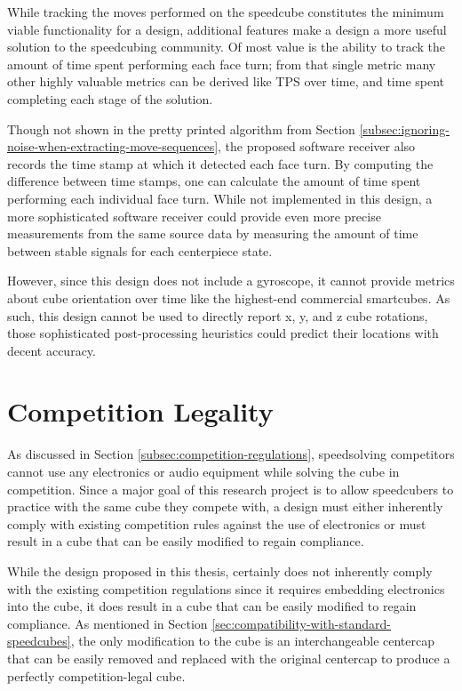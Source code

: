 While tracking the moves performed on the speedcube constitutes the
minimum viable functionality for a design, additional features make a
design a more useful solution to the speedcubing community. Of most
value is the ability to track the amount of time spent performing each
face turn; from that single metric many other highly valuable metrics
can be derived like TPS over time, and time spent completing each stage
of the solution.

Though not shown in the pretty printed algorithm from Section
\ref{subsec:ignoring-noise-when-extracting-move-sequences}, the
proposed software receiver also records the time stamp at which it
detected each face turn. By computing the difference between time
stamps, one can calculate the amount of time spent performing each
individual face turn. While not implemented in this design, a more
sophisticated software receiver could provide even more precise
measurements from the same source data by measuring the amount of time
between stable signals for each centerpiece state.

However, since this design does not include a gyroscope, it cannot
provide metrics about cube orientation over time like the highest-end
commercial smartcubes. As such, this design cannot be used to directly
report x, y, and z cube rotations, those sophisticated post-processing
heuristics could predict their locations with decent accuracy.


\section{Competition Legality}
\label{sec:competition-legality}

As discussed in Section \ref{subsec:competition-regulations},
speedsolving competitors cannot use any electronics or audio equipment
while solving the cube in competition. Since a major goal of this
research project is to allow speedcubers to practice with the same cube
they compete with, a design must either inherently comply with existing
competition rules against the use of electronics or must result in a
cube that can be easily modified to regain compliance.

While the design proposed in this thesis, certainly does not inherently
comply with the existing competition regulations since it requires
embedding electronics into the cube, it does result in a cube that can
be easily modified to regain compliance. As mentioned in Section
\ref{sec:compatibility-with-standard-speedcubes}, the only modification
to the cube is an interchangeable centercap that can be easily removed
and replaced with the original centercap to produce a perfectly
competition-legal cube.

